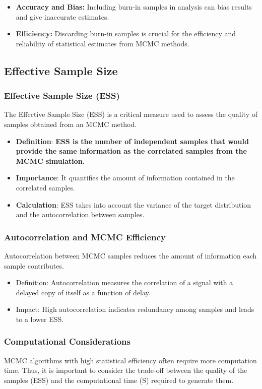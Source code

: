 \documentclass{article}
\begin{document}
\begin{itemize}
    \item \textbf{Accuracy and Bias:} Including burn-in samples in analysis can bias results and give inaccurate estimates.
    \item \textbf{Efficiency:} Discarding burn-in samples is crucial for the efficiency and reliability of statistical estimates from MCMC methods.
\end{itemize}

\subsection{Effective Sample Size}
\subsubsection{Effective Sample Size (ESS)}
The Effective Sample Size (ESS) is a critical measure used to assess the quality of samples obtained from an MCMC method.

\begin{itemize}
    \item \textbf{Definition}: \textbf{ESS is the number of independent samples that would provide the same information as the correlated samples from the MCMC simulation.}
    \item \textbf{Importance}: It quantifies the amount of information contained in the correlated samples.
    \item \textbf{Calculation}: ESS takes into account the variance of the target distribution and the autocorrelation between samples.
\end{itemize}

\subsubsection{Autocorrelation and MCMC Efficiency}
Autocorrelation between MCMC samples reduces the amount of information each sample contributes. 

\begin{itemize}
    \item Definition: Autocorrelation measures the correlation of a signal with a delayed copy of itself as a function of delay.
    \item Impact: High autocorrelation indicates redundancy among samples and leads to a lower ESS.
\end{itemize}

\subsubsection{Computational Considerations}
MCMC algorithms with high statistical efficiency often require more computation time. Thus, it is important to consider the trade-off between the quality of the samples (ESS) and the computational time (S) required to generate them.
\end{document}
